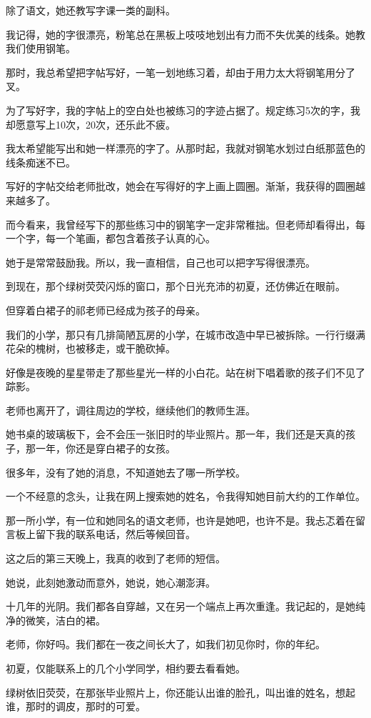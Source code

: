 \documentclass[12pt,a4paper]{article}
\begin{document}
		除了语文，她还教写字课一类的副科。\par
		我记得，她的字很漂亮，粉笔总在黑板上吱吱地划出有力而不失优美的线条。她教我们使用钢笔。\par
		那时，我总希望把字帖写好，一笔一划地练习着，却由于用力太大将钢笔用分了叉。\par
		为了写好字，我的字帖上的空白处也被练习的字迹占据了。规定练习5次的字，我却愿意写上10次，20次，还乐此不疲。\par
		我太希望能写出和她一样漂亮的字了。从那时起，我就对钢笔水划过白纸那蓝色的线条痴迷不已。\par
		写好的字帖交给老师批改，她会在写得好的字上画上圆圈。渐渐，我获得的圆圈越来越多了。\par
		而今看来，我曾经写下的那些练习中的钢笔字一定非常稚拙。但老师却看得出，每一个字，每一个笔画，都包含着孩子认真的心。\par
		她于是常常鼓励我。所以，我一直相信，自己也可以把字写得很漂亮。

		到现在，那个绿树荧荧闪烁的窗口，那个日光充沛的初夏，还仿佛近在眼前。\par
		但穿着白裙子的祁老师已经成为孩子的母亲。\par
		我们的小学，那只有几排简陋瓦房的小学，在城市改造中早已被拆除。一行行缀满花朵的槐树，也被移走，或干脆砍掉。\par
		好像是夜晚的星星带走了那些星光一样的小白花。站在树下唱着歌的孩子们不见了踪影。\par
		老师也离开了，调往周边的学校，继续他们的教师生涯。\par
		她书桌的玻璃板下，会不会压一张旧时的毕业照片。那一年，我们还是天真的孩子，那一年，你还是穿白裙子的女孩。

		很多年，没有了她的消息，不知道她去了哪一所学校。

		一个不经意的念头，让我在网上搜索她的姓名，令我得知她目前大约的工作单位。\par
		那一所小学，有一位和她同名的语文老师，也许是她吧，也许不是。我忐忑着在留言板上留下我的联系电话，然后等候回音。\par
		这之后的第三天晚上，我真的收到了老师的短信。

		她说，此刻她激动而意外，她说，她心潮澎湃。

		十几年的光阴。我们都各自穿越，又在另一个端点上再次重逢。我记起的，是她纯净的微笑，洁白的裙。

		老师，你好吗。我们都在一夜之间长大了，如我们初见你时，你的年纪。\par
		初夏，仅能联系上的几个小学同学，相约要去看看她。\par
		绿树依旧荧荧，在那张毕业照片上，你还能认出谁的脸孔，叫出谁的姓名，想起谁，那时的调皮，那时的可爱。
\end{document}
